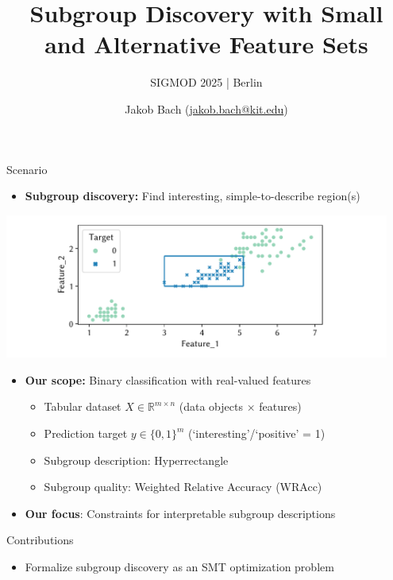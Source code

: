 \documentclass[USenglish]{article} %
\title{\Huge\textcolor{KITgreen}{Subgroup Discovery with Small and Alternative Feature Sets}} %
\subtitle{SIGMOD 2025 | Berlin}
\author{\textcolor{KITgray}{Jakob Bach (\href{mailto:jakob.bach@kit.edu}{jakob.bach@kit.edu})}}
\institute{} %
\begin{document}
\maketitle

\begin{minipage}[t]{0.49\textwidth} %
	\vspace{0pt} %
	\begin{standardbox}{Scenario}
		\begin{itemize}
			\item \textbf{Subgroup discovery:} Find interesting, simple-to-describe region(s)
		\end{itemize}
		\centering
		\includegraphics[width=0.95\textwidth, trim=70 10 90 10, clip]{plots/csd-exemplary-subgroup.pdf}
		\begin{itemize}
			\item \textbf{Our scope:} Binary classification with real-valued features
			\begin{itemize}
				\item Tabular dataset $X \in \mathbb{R}^{m \times n}$ (data objects $\times$ features)
				\item Prediction target $y \in \{0, 1\}^m$ (`interesting'/`positive' = 1)
				\item Subgroup description: Hyperrectangle
				\item Subgroup quality: Weighted Relative Accuracy (WRAcc)
			\end{itemize}
			\vspace{\baselineskip}
			\item \textbf{Our focus}: Constraints for interpretable subgroup descriptions
		\end{itemize}
	\end{standardbox}
	\vspace{10pt}
	\begin{standardbox}{Contributions}
		\begin{itemize}
			\item Formalize subgroup discovery as an SMT optimization problem

\end{itemize}
\end{standardbox}
\end{minipage}
\end{document}
